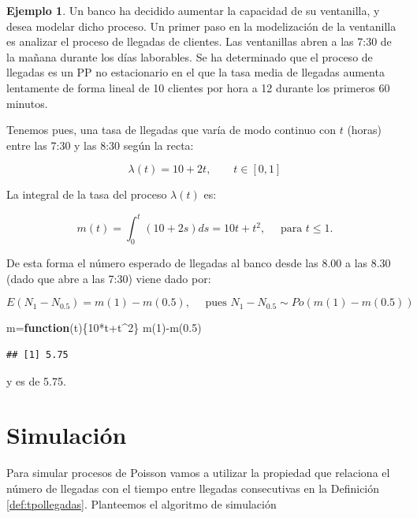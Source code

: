 \documentclass[
]{book}
\newenvironment{Shaded}{\begin{snugshade}}{\end{snugshade}}
\newcommand{\ControlFlowTok}[1]{\textcolor[rgb]{0.13,0.29,0.53}{\textbf{#1}}}
\newcommand{\DecValTok}[1]{\textcolor[rgb]{0.00,0.00,0.81}{#1}}
\newcommand{\FloatTok}[1]{\textcolor[rgb]{0.00,0.00,0.81}{#1}}
\newcommand{\FunctionTok}[1]{\textcolor[rgb]{0.00,0.00,0.00}{#1}}
\newcommand{\NormalTok}[1]{#1}
\newcommand{\OtherTok}[1]{\textcolor[rgb]{0.56,0.35,0.01}{#1}}
\newcommand{\SpecialCharTok}[1]{\textcolor[rgb]{0.00,0.00,0.00}{#1}}
\theoremstyle{definition}
\theoremstyle{definition}
\newtheorem{example}{Ejemplo}[chapter]
\theoremstyle{definition}
\theoremstyle{definition}
\theoremstyle{remark}
\begin{document}
\begin{example}
\protect\hypertarget{exm:pp005}{}\label{exm:pp005}Un banco ha decidido aumentar la capacidad de su ventanilla, y desea modelar dicho proceso. Un primer paso en la modelización de la ventanilla es analizar el proceso de llegadas de clientes. Las ventanillas abren a las 7:30 de la mañana durante los días laborables. Se ha determinado que el proceso de llegadas es un PP no estacionario en el que la tasa media de llegadas aumenta lentamente de forma lineal de 10 clientes por hora a 12 durante los primeros 60 minutos.

Tenemos pues, una tasa de llegadas que varía de modo continuo con \(t\) (horas) entre las 7:30 y las 8:30 según la recta:

\[\lambda(t) = 10 + 2t, \qquad t \in [0,1]\]

La integral de la tasa del proceso \(\lambda(t)\) es:

\[m(t) = \int_0^t (10+2s)ds = 10t + t^2, \quad \text{ para } t \leq 1.\]

De esta forma el número esperado de llegadas al banco desde las 8.00 a las 8.30 (dado que abre a las 7:30) viene dado por:

\[E(N_1 - N_{0.5}) = m(1) - m(0.5), \quad \text{ pues } N_1 - N_{0.5} \sim Po(m(1) - m(0.5))\]

\begin{Shaded}
\begin{Highlighting}[]
\NormalTok{m}\OtherTok{=}\ControlFlowTok{function}\NormalTok{(t)\{}\DecValTok{10}\SpecialCharTok{*}\NormalTok{t}\SpecialCharTok{+}\NormalTok{t}\SpecialCharTok{\^{}}\DecValTok{2}\NormalTok{\}}
\FunctionTok{m}\NormalTok{(}\DecValTok{1}\NormalTok{)}\SpecialCharTok{{-}}\FunctionTok{m}\NormalTok{(}\FloatTok{0.5}\NormalTok{)}
\end{Highlighting}
\end{Shaded}

\begin{verbatim}
## [1] 5.75
\end{verbatim}

y es de 5.75.
\end{example}

\hypertarget{simulaciuxf3n}{%
\section{Simulación}\label{simulaciuxf3n}}

Para simular procesos de Poisson vamos a utilizar la propiedad que relaciona el número de llegadas con el tiempo entre llegadas consecutivas en la Definición \ref{def:tpollegadas}. Planteemos el algoritmo de simulación
\end{document}
